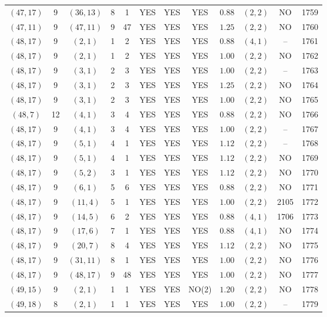 \begin{longtable}{|c|c|c|c|c|c|c|c|c|c|c|c|}
$(47,17)$ & 9 & $(36,13)$ & 8 & 1 & YES & YES & YES & $0.88$ & $(2,2)$ & NO & 1759\\
$(47,11)$ & 9 & $(47,11)$ & 9 & 47 & YES & YES & YES & $1.25$ & $(2,2)$ & NO & 1760\\
$(48,17)$ & 9 & $(2,1)$ & 1 & 2 & YES & YES & YES & $0.88$ & $(4,1)$ & -- & 1761\\
$(48,17)$ & 9 & $(2,1)$ & 1 & 2 & YES & YES & YES & $1.00$ & $(2,2)$ & NO & 1762\\
$(48,17)$ & 9 & $(3,1)$ & 2 & 3 & YES & YES & YES & $1.00$ & $(2,2)$ & -- & 1763\\
$(48,17)$ & 9 & $(3,1)$ & 2 & 3 & YES & YES & YES & $1.25$ & $(2,2)$ & NO & 1764\\
$(48,17)$ & 9 & $(3,1)$ & 2 & 3 & YES & YES & YES & $1.00$ & $(2,2)$ & NO & 1765\\
$(48,7)$ & 12 & $(4,1)$ & 3 & 4 & YES & YES & YES & $0.88$ & $(2,2)$ & NO & 1766\\
$(48,17)$ & 9 & $(4,1)$ & 3 & 4 & YES & YES & YES & $1.00$ & $(2,2)$ & -- & 1767\\
$(48,17)$ & 9 & $(5,1)$ & 4 & 1 & YES & YES & YES & $1.12$ & $(2,2)$ & -- & 1768\\
$(48,17)$ & 9 & $(5,1)$ & 4 & 1 & YES & YES & YES & $1.12$ & $(2,2)$ & NO & 1769\\
$(48,17)$ & 9 & $(5,2)$ & 3 & 1 & YES & YES & YES & $1.12$ & $(2,2)$ & NO & 1770\\
$(48,17)$ & 9 & $(6,1)$ & 5 & 6 & YES & YES & YES & $0.88$ & $(2,2)$ & NO & 1771\\
$(48,17)$ & 9 & $(11,4)$ & 5 & 1 & YES & YES & YES & $1.00$ & $(2,2)$ & 2105 & 1772\\
$(48,17)$ & 9 & $(14,5)$ & 6 & 2 & YES & YES & YES & $0.88$ & $(4,1)$ & 1706 & 1773\\
$(48,17)$ & 9 & $(17,6)$ & 7 & 1 & YES & YES & YES & $0.88$ & $(4,1)$ & NO & 1774\\
$(48,17)$ & 9 & $(20,7)$ & 8 & 4 & YES & YES & YES & $1.12$ & $(2,2)$ & NO & 1775\\
$(48,17)$ & 9 & $(31,11)$ & 8 & 1 & YES & YES & YES & $1.00$ & $(2,2)$ & NO & 1776\\
$(48,17)$ & 9 & $(48,17)$ & 9 & 48 & YES & YES & YES & $1.00$ & $(2,2)$ & NO & 1777\\
$(49,15)$ & 9 & $(2,1)$ & 1 & 1 & YES & YES & NO(2) & $1.20$ & $(2,2)$ & NO & 1778\\
$(49,18)$ & 8 & $(2,1)$ & 1 & 1 & YES & YES & YES & $1.00$ & $(2,2)$ & -- & 1779\\

\end{longtable}
